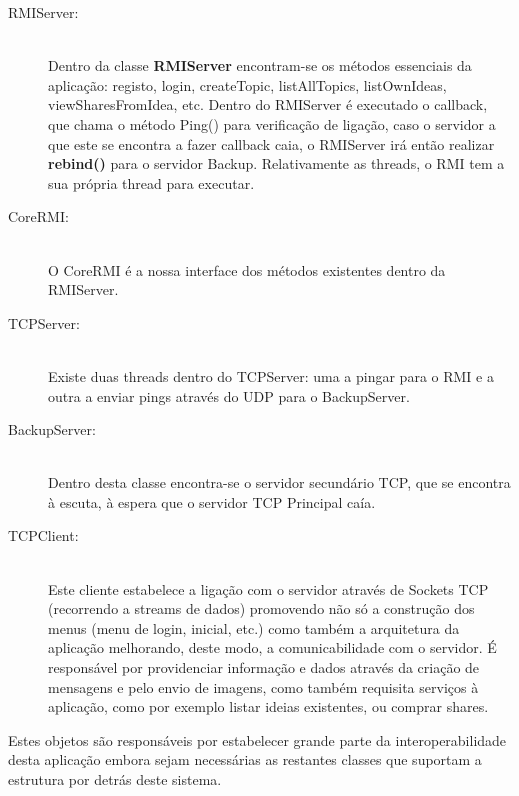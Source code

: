 \documentclass[12pt]{article} %
\begin{document}
\begin{description}
	\item[RMIServer:] \hfill \\
	Dentro da classe \textbf{RMIServer} encontram-se os métodos essenciais da aplicação: registo, login, createTopic, listAllTopics, listOwnIdeas, viewSharesFromIdea, etc. Dentro do RMIServer é executado o callback, que chama o método Ping() para verificação de ligação, caso o servidor a que este se encontra a fazer callback caia, o RMIServer irá então realizar \textbf{rebind()} para o servidor Backup. Relativamente as threads, o RMI tem a sua própria thread para executar. 
	\item[CoreRMI:] \hfill \\
	O CoreRMI é a nossa interface dos métodos existentes dentro da RMIServer.
	\item[TCPServer:] \hfill \\
	Existe duas threads dentro do TCPServer: uma a  pingar para o RMI e a outra a enviar pings através do UDP para o BackupServer.
	\item[BackupServer:] \hfill \\
	Dentro desta classe encontra-se o servidor secundário TCP, que se encontra à escuta, à espera que o servidor TCP Principal caía.
	\item[TCPClient:] \hfill \\
	Este cliente estabelece a ligação com o servidor através de Sockets TCP (recorrendo a streams de dados) promovendo não só a construção dos menus (menu de login, inicial, etc.) como também a arquitetura da aplicação melhorando, deste modo, a comunicabilidade com o servidor. É responsável por providenciar informação e dados através da criação de mensagens e pelo envio de imagens, como também requisita serviços à aplicação, como por exemplo listar ideias existentes, ou comprar shares.
\end{description}

Estes objetos são responsáveis por estabelecer grande parte da interoperabilidade desta aplicação embora sejam necessárias as restantes classes que suportam a estrutura por detrás deste sistema.\\ 
\end{document}
